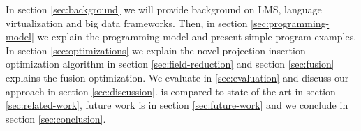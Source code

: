 In section \ref{sec:background} we will provide background on LMS, language virtualization and big data frameworks. Then, in section \ref{sec:programming-model} we explain the programming model and present simple program examples. In section \ref{sec:optimizations} we explain the novel projection insertion optimization algorithm in section \ref{sec:field-reduction} and section \ref{sec:fusion} explains the fusion optimization. We evaluate \tool in \ref{sec:evaluation} and discuss our approach in section \ref{sec:discussion}. \tool is compared to state of the art in section \ref{sec:related-work}, future work is in section \ref{sec:future-work} and we conclude in section \ref{sec:conclusion}.
